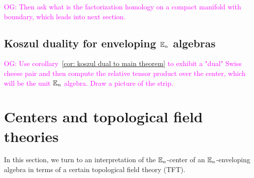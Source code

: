 \documentclass[11pt]{amsart}
\numberwithin{equation}{section}
\def\owen{\textcolor{magenta}{OG: }\textcolor{magenta}}
\begin{document}
\owen{Then ask what is the factorization homology on a compact manifold with boundary, which leads into next section.}

\subsection{Koszul duality for enveloping $\mathbb E_n$ algebras}

\owen{Use corollary~\ref{cor: koszul dual to main theorem} to exhibit a "dual" Swiss cheese pair and then compute the relative tensor product over the center, which will be the unit $\mathbb E_n$ algebra. Draw a picture of the strip.}

\section{Centers and topological field theories}
\label{sec: TFT}
%
%
%
%

In this section, we turn to an interpretation of the $\mathbb E_n$-center of an $\mathbb E_n$-enveloping algebra in terms of a certain topological field theory (TFT).
\end{document}
